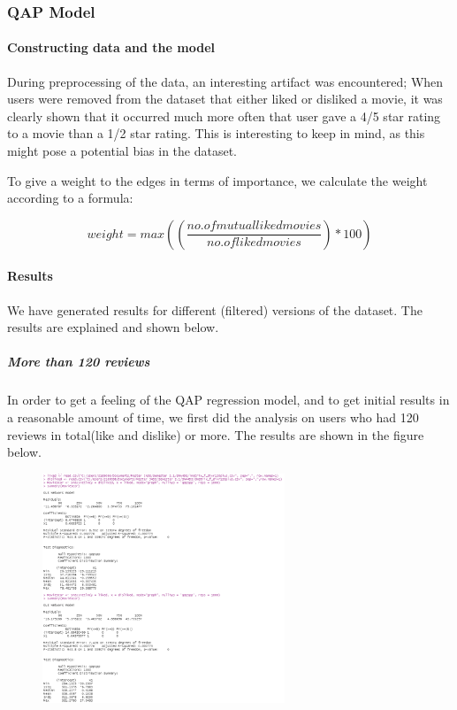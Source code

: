 \documentclass[
  english,
  man,floatsintext]{apa6}
\let\oldparagraph\paragraph
\renewcommand{\paragraph}[1]{\oldparagraph{#1}\mbox{}}
\let\oldsubparagraph\subparagraph
\renewcommand{\subparagraph}[1]{\oldsubparagraph{#1}\mbox{}}
\begin{document}
\hypertarget{qap-model}{%
\subsubsection{QAP Model}\label{qap-model}}

\hypertarget{constructing-data-and-the-model}{%
\paragraph{Constructing data and the model}\label{constructing-data-and-the-model}}

During preprocessing of the data, an interesting artifact was encountered; When users were removed from the dataset that either liked or disliked a movie, it was clearly shown that it occurred much more often that user gave a 4/5 star rating to a movie than a 1/2 star rating. This is interesting to keep in mind, as this might pose a potential bias in the dataset.

To give a weight to the edges in terms of importance, we calculate the weight according to a formula:

\[weight = max((\frac{no. of mutual liked movies}{
no. of liked movies})*100) \]

\hypertarget{results-1}{%
\paragraph{Results}\label{results-1}}

We have generated results for different (filtered) versions of the dataset. The results are explained and shown below.

\hypertarget{more-than-120-reviews}{%
\subparagraph{More than 120 reviews}\label{more-than-120-reviews}}

In order to get a feeling of the QAP regression model, and to get initial results in a reasonable amount of time, we first did the analysis on users who had 120 reviews in total(like and dislike) or more. The results are shown in the figure below.

\begin{figure}
\includegraphics[width=2.85in]{results120plus} \caption{ }\label{fig:unnamed-chunk-7}
\end{figure}
\end{document}

